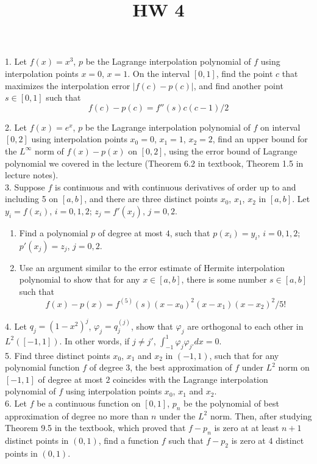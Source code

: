 \documentclass[20pt]{article} %
\title{HW 4}
\theoremstyle{break}
\begin{document}
\maketitle

1. Let $f(x)=x^3$, $p$ be the Lagrange interpolation polynomial of $f$ using interpolation points $x=0$, $x=1$.  On the interval $[0, 1]$, find the point $c$ that maximizes the interpolation error $|f(c)-p(c)|$, and find another point $s\in [0, 1]$ such that
\[f(c)-p(c)=f''(s)c(c-1)/2\]

2. Let $f(x)=e^x$, $p$ be the Lagrange interpolation polynomial of $f$ on interval $[0, 2]$ using interpolation points $x_0=0$, $x_1=1$, $x_2=2$, find an upper bound for the $L^\infty$ norm of $f(x)-p(x)$ on $[0, 2]$, using the error bound of Lagrange polynomial we covered in the lecture (Theorem 6.2 in textbook, Theorem 1.5 in lecture notes).\\

3. Suppose $f$ is continuous and with continuous derivatives of order up to and including 5 on $[a, b]$, and there are three distinct points $x_0$, $x_1$, $x_2$ in $[a, b]$. Let $y_i=f(x_i)$, $i=0, 1, 2$; $z_j=f'(x_j)$, $j=0, 2$.
\begin{enumerate}
\item Find a polynomial $p$ of degree at most $4$, such that $p(x_i)=y_i$, $i=0, 1, 2$; $p'(x_j)=z_j$, $j=0, 2$.
\item Use an argument similar to the error estimate of Hermite interpolation polynomial to show that for any $x\in [a, b]$, there is some number $s\in [a, b]$ such that
  \[f(x)-p(x)=f^{(5)}(s)(x-x_0)^2(x-x_1)(x-x_2)^2/5!\]
\end{enumerate}

4. Let $q_j=(1-x^2)^j$, $\varphi_j=q_j^{(j)}$, show that $\varphi_j$ are orthogonal to each other in $L^2([-1, 1])$. In other words, if $j\not=j'$, $\int_{-1}^1\varphi_j\varphi_{j'}dx=0$. \\

5. Find three distinct points $x_0$, $x_1$ and $x_2$ in $(-1, 1)$, such that for any polynomial function $f$ of degree $3$, the best approximation of $f$ under $L^2$ norm on $[-1, 1]$ of degree at most $2$ coincides with the Lagrange interpolation polynomial of $f$ using interpolation points $x_0$, $x_1$ and $x_2$.\\

6. Let $f$ be a continuous function on $[0, 1]$, $p_n$ be the polynomial of best approximation of degree no more than $n$ under the $L^2$ norm. Then, after studying Theorem 9.5 in the textbook, which proved that $f-p_n$ is zero at at least $n+1$ distinct points in $(0, 1)$, find a function $f$ such that $f-p_2$ is zero at $4$ distinct points in $(0, 1)$.
\end{document}
